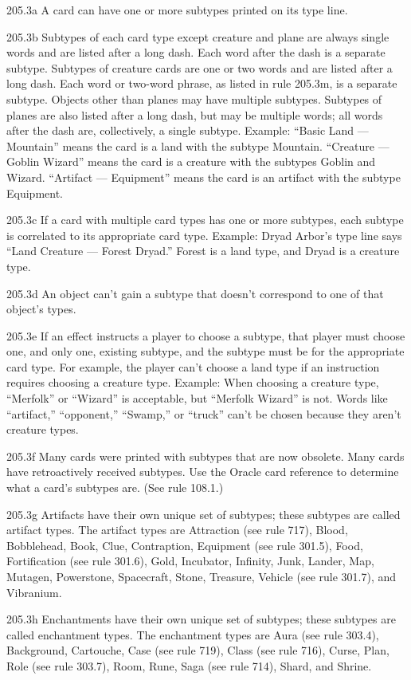 205.3a A card can have one or more subtypes printed on its type line.

205.3b Subtypes of each card type except creature and plane are always single words and are listed after a long dash. Each word after the dash is a separate subtype. Subtypes of creature cards are one or two words and are listed after a long dash. Each word or two-word phrase, as listed in rule 205.3m, is a separate subtype. Objects other than planes may have multiple subtypes. Subtypes of planes are also listed after a long dash, but may be multiple words; all words after the dash are, collectively, a single subtype.
Example: “Basic Land — Mountain” means the card is a land with the subtype Mountain. “Creature — Goblin Wizard” means the card is a creature with the subtypes Goblin and Wizard. “Artifact — Equipment” means the card is an artifact with the subtype Equipment.

205.3c If a card with multiple card types has one or more subtypes, each subtype is correlated to its appropriate card type.
Example: Dryad Arbor’s type line says “Land Creature — Forest Dryad.” Forest is a land type, and Dryad is a creature type.

205.3d An object can’t gain a subtype that doesn’t correspond to one of that object’s types.

205.3e If an effect instructs a player to choose a subtype, that player must choose one, and only one, existing subtype, and the subtype must be for the appropriate card type. For example, the player can’t choose a land type if an instruction requires choosing a creature type.
Example: When choosing a creature type, “Merfolk” or “Wizard” is acceptable, but “Merfolk Wizard” is not. Words like “artifact,” “opponent,” “Swamp,” or “truck” can’t be chosen because they aren’t creature types.

205.3f Many cards were printed with subtypes that are now obsolete. Many cards have retroactively received subtypes. Use the Oracle card reference to determine what a card’s subtypes are. (See rule 108.1.)

205.3g Artifacts have their own unique set of subtypes; these subtypes are called artifact types. The artifact types are Attraction (see rule 717), Blood, Bobblehead, Book, Clue, Contraption, Equipment (see rule 301.5), Food, Fortification (see rule 301.6), Gold, Incubator, Infinity, Junk, Lander, Map, Mutagen, Powerstone, Spacecraft, Stone, Treasure, Vehicle (see rule 301.7), and Vibranium.

205.3h Enchantments have their own unique set of subtypes; these subtypes are called enchantment types. The enchantment types are Aura (see rule 303.4), Background, Cartouche, Case (see rule 719), Class (see rule 716), Curse, Plan, Role (see rule 303.7), Room, Rune, Saga (see rule 714), Shard, and Shrine.

